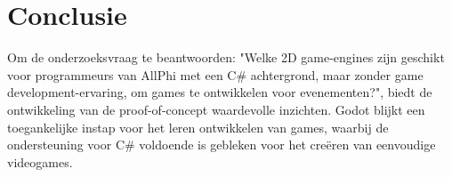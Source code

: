 
\chapter{Conclusie}%
\label{ch:conclusie}

Om de onderzoeksvraag te beantwoorden: "Welke 2D game-engines zijn geschikt voor programmeurs van AllPhi met een C\# achtergrond, maar zonder game development-ervaring, om games te ontwikkelen voor evenementen?", biedt de ontwikkeling van de proof-of-concept waardevolle inzichten. Godot blijkt een toegankelijke instap voor het leren ontwikkelen van games, waarbij de ondersteuning voor C\# voldoende is gebleken voor het creëren van eenvoudige videogames.